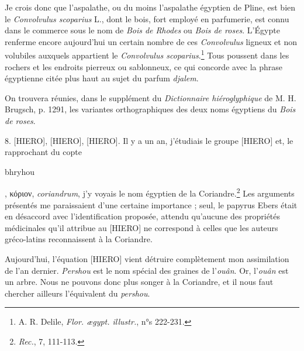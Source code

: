 \documentclass[a4paper, 11pt, oneside]{article}
\begin{document}
Je crois donc que l'aspalathe, ou du moins l'aspalathe égyptien de Pline, est bien le \emph{Convolvulus scoparius} L., dont le bois, fort employé en parfumerie, est connu dans le commerce sous le nom de \emph{Bois de Rhodes} ou \emph{Bois de roses}. L'Égypte renferme encore aujourd'hui un certain nombre de ces \emph{Convolvulus} ligneux et non volubiles auxquels appartient le \emph{Convolvulus scoparius}.\footnote{A. R. Delile, \emph{Flor. ægypt. illustr.}, n°s 222-231.} Tous poussent dans les rochers et les endroits pierreux ou sablonneux, ce qui concorde avec la phrase égyptienne citée plus haut au sujet du parfum \emph{djalem}.

On trouvera réunies, dans le supplément du \emph{Dictionnaire hiéroglyphique} de M. H. Brugsch, p. 1291, les variantes orthographiques des deux noms égyptiens du \emph{Bois de roses}.

8. [HIERO], [HIERO], [HIERO]. Il y a un an, j'étudiais le groupe [HIERO] et, le rapprochant du copte \begin{coptic}bhryhou\end{coptic}, κόριον, \emph{coriandrum}, j'y voyais le nom égyptien de la Coriandre.\footnote{\emph{Rec.}, 7, 111-113.} Les arguments présentés me paraissaient d'une certaine importance ; seul, le papyrus Ebers était en désaccord avec l'identification proposée, attendu qu'aucune des propriétés médicinales qu'il attribue au [HIERO] ne correspond à celles que les auteurs gréco-latins reconnaissent à la Coriandre.

Aujourd'hui, l'équation [HIERO] vient détruire complètement mon assimilation de l'an dernier. \emph{Pershou} est le nom spécial des graines de l'\emph{ouân}. Or, l'\emph{ouân} est un arbre. Nous ne pouvons donc plus songer à la Coriandre, et il nous faut chercher ailleurs l'équivalent du \emph{pershou}.


\end{document}
